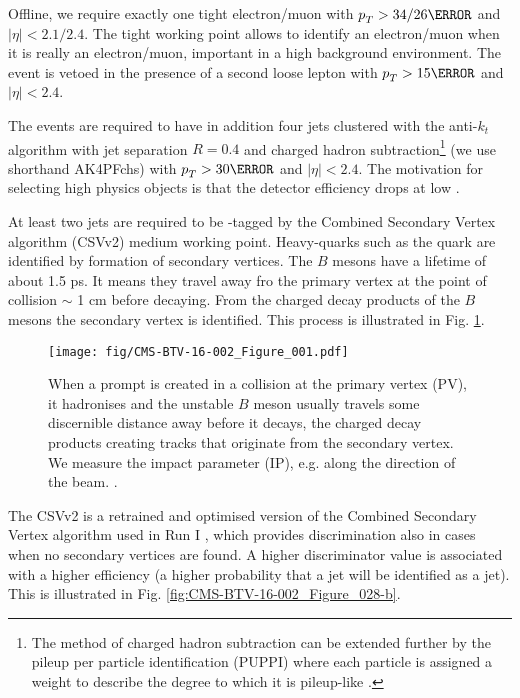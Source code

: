 Offline, we require exactly one tight electron/muon with $\pt > 34/26\GeV$ and $|\eta| < 2.1/2.4$. The tight working point allows to identify an electron/muon when it is really an electron/muon, important in a high background environment.
The event is vetoed in the presence of a second loose lepton with $\pt > 15\GeV$ and $|\eta| < 2.4$.

The events are required to have in addition four jets clustered with the anti-$k_{t}$ algorithm with jet separation $R=0.4$ and charged hadron subtraction\footnote{The method of charged hadron subtraction can be extended further by the pileup per particle identification (PUPPI) where each particle is assigned a weight to describe the degree to which it is pileup-like \cite{Bertolini:2014bba}.} (we use shorthand AK4PFchs) with $\pt>30\GeV$  and $|\eta|<2.4$. The motivation for selecting high \pt physics objects is that the detector efficiency drops at low \pt.

At least two jets are required to be \cPqb-tagged by the Combined Secondary Vertex algorithm (CSVv2) medium working point. Heavy-quarks such as the \cPqb quark are identified by formation of secondary vertices. The $B$ mesons have a lifetime of about 1.5 ps. It means they travel away fro the primary vertex at the point of collision $\sim$ 1 cm before decaying. From the charged decay products of the $B$ mesons the secondary vertex is identified. This process is illustrated in Fig. \ref{fig:CMS-BTV-16-002_Figure_001}.

\begin{figure}[hbtp]
\centering
\texttt{[image: fig/CMS-BTV-16-002\_Figure\_001.pdf]}
\caption{When a prompt \cPqb is created in a collision at the primary vertex (PV), it hadronises and the unstable $B$ meson usually travels some discernible distance away before it decays, the charged decay products creating tracks that originate from the secondary vertex. We measure the impact parameter (IP), e.g. along the direction of the beam. \cite{Sirunyan:2017ezt}.}
\label{fig:CMS-BTV-16-002_Figure_001}
\end{figure}

The CSVv2 is a retrained and optimised version of the Combined Secondary Vertex algorithm used in Run I \cite{Chatrchyan:2012jua}, which provides discrimination also in cases when no secondary vertices are found. A higher discriminator value is associated with a higher efficiency (a higher probability that a \cPqb jet will be identified as a \cPqb jet). This is illustrated in Fig. \ref{fig:CMS-BTV-16-002_Figure_028-b}.

